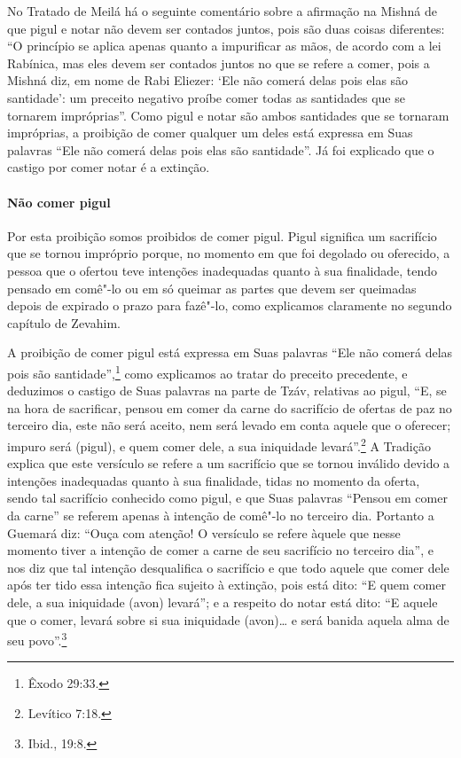 \begin{multicols}{2}
No Tratado de Meilá\starr{} há o seguinte comentário sobre a afirmação na Mishná\starr{}
de que pigul\starr{} e notar\starr{} não devem ser contados juntos, pois são
duas coisas diferentes: ``O princípio se aplica apenas quanto a
impurificar as mãos, de acordo com a lei Rabínica, mas eles devem ser
contados juntos no que se refere a comer, pois a Mishná\starr{} diz, em nome de
Rabi Eliezer\starr: `Ele não comerá delas pois elas são santidade': um
preceito negativo proíbe comer todas as santidades que se tornarem
impróprias''. Como pigul\starr{} e notar\starr{} são ambos santidades que se
tornaram impróprias, a proibição de comer qualquer um deles está
expressa em Suas palavras ``Ele não comerá delas pois elas são
santidade''. Já foi explicado que o castigo por comer notar\starr{} é a
extinção.

\paragraph{Não comer pigul\starr{}}

Por esta proibição somos proibidos de comer pigul\starr. Pigul\starr{}
significa um sacrifício que se tornou impróprio porque, no momento em
que foi degolado ou oferecido, a pessoa que o ofertou teve intenções
inadequadas quanto à sua finalidade, tendo pensado em comê"-lo ou em só
queimar as partes que devem ser queimadas depois de expirado o prazo
para fazê"-lo, como explicamos claramente no segundo capítulo de
Zevahim\starr.

A proibição de comer pigul\starr{} está expressa em Suas palavras ``Ele não
comerá delas pois são santidade'',\footnote{Êxodo 29:33.} como explicamos ao
tratar do preceito precedente, e deduzimos o castigo de Suas palavras
na parte de Tzáv\starr, relativas ao pigul\starr, ``E, se na hora de sacrificar,
pensou em comer da carne do sacrifício de ofertas de paz no terceiro
dia, este não será aceito, nem será levado em conta aquele que o
oferecer; impuro será (pigul\starr), e quem comer dele, a sua iniquidade
levará''.\footnote{Levítico 7:18.} A Tradição explica que este versículo se
refere a um sacrifício que se tornou inválido devido a intenções
inadequadas quanto à sua finalidade, tidas no momento da oferta, sendo
tal sacrifício conhecido como pigul\starr, e que Suas palavras ``Pensou em
comer da carne'' se referem apenas à intenção de comê"-lo no terceiro
dia. Portanto a Guemará\starr{} diz: ``Ouça com atenção! O versículo se refere
àquele que nesse momento tiver a intenção de comer a carne de seu
sacrifício no terceiro dia'', e nos diz que tal intenção desqualifica o
sacrifício e que todo aquele que comer dele após ter tido essa intenção
fica sujeito à extinção, pois está dito: ``E quem comer dele, a sua
iniquidade (avon\starr) levará''; e a respeito do notar\starr{} está dito: ``E
aquele que o comer, levará sobre si sua iniquidade (avon\starr)\ldots{} e será
banida aquela alma de seu povo''.\footnote{Ibid., 19:8.}


\end{multicols}
